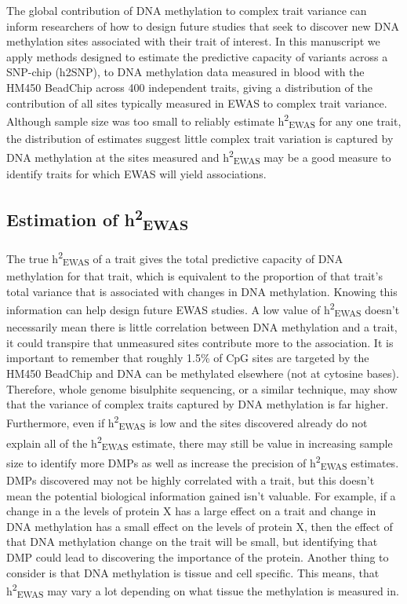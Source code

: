 \documentclass[11pt,oneside]{bristolthesis}
\begin{document}
The global contribution of DNA methylation to complex trait variance can inform researchers of how to design future studies that seek to discover new DNA methylation sites associated with their trait of interest. In this manuscript we apply methods designed to estimate the predictive capacity of variants across a SNP-chip (h2SNP), to DNA methylation data measured in blood with the HM450 BeadChip across 400 independent traits, giving a distribution of the contribution of all sites typically measured in EWAS to complex trait variance. Although sample size was too small to reliably estimate h\textsuperscript{2}\textsubscript{EWAS} for any one trait, the distribution of estimates suggest little complex trait variation is captured by DNA methylation at the sites measured and h\textsuperscript{2}\textsubscript{EWAS} may be a good measure to identify traits for which EWAS will yield associations.

\hypertarget{estimation-of-h2ewas}{%
\subsection{\texorpdfstring{Estimation of h\textsuperscript{2}\textsubscript{EWAS}}{Estimation of h2EWAS}}\label{estimation-of-h2ewas}}

The true h\textsuperscript{2}\textsubscript{EWAS} of a trait gives the total predictive capacity of DNA methylation for that trait, which is equivalent to the proportion of that trait's total variance that is associated with changes in DNA methylation. Knowing this information can help design future EWAS studies. A low value of h\textsuperscript{2}\textsubscript{EWAS} doesn't necessarily mean there is little correlation between DNA methylation and a trait, it could transpire that unmeasured sites contribute more to the association. It is important to remember that roughly 1.5\% of CpG sites are targeted by the HM450 BeadChip and DNA can be methylated elsewhere (not at cytosine bases). Therefore, whole genome bisulphite sequencing, or a similar technique, may show that the variance of complex traits captured by DNA methylation is far higher. Furthermore, even if h\textsuperscript{2}\textsubscript{EWAS} is low and the sites discovered already do not explain all of the h\textsuperscript{2}\textsubscript{EWAS} estimate, there may still be value in increasing sample size to identify more DMPs as well as increase the precision of h\textsuperscript{2}\textsubscript{EWAS} estimates. DMPs discovered may not be highly correlated with a trait, but this doesn't mean the potential biological information gained isn't valuable. For example, if a change in a the levels of protein X has a large effect on a trait and change in DNA methylation has a small effect on the levels of protein X, then the effect of that DNA methylation change on the trait will be small, but identifying that DMP could lead to discovering the importance of the protein. Another thing to consider is that DNA methylation is tissue and cell specific. This means, that h\textsuperscript{2}\textsubscript{EWAS} may vary a lot depending on what tissue the methylation is measured in.
\end{document}
